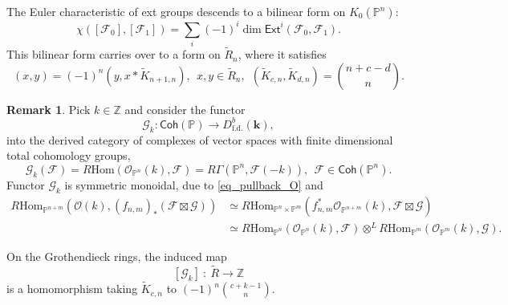 \documentclass{article}
\def\lra{\longrightarrow}
\def\Ext{\mathsf{Ext}}
\def\Z{\mathbb Z}
\newcommand{\Coh}{\mathsf{Coh}}
\newcommand{\kk}{\mathbf{k}}
\newcommand{\mcO}{\mathcal{O}}
\newcommand{\mcF}{\mathcal{F}}
\newcommand{\mcG}{\mathcal{G}}
\newcommand{\wtR}{\widetilde{R}}
\newcommand{\wtK}{\widetilde{K}}
\newcommand{\PP}{\mathbb{P}}
\theoremstyle{definition}
\newtheorem{remark}[thm]{Remark}
\theoremstyle{definition}
\begin{document}
The Euler characteristic of ext groups descends to a bilinear form on $K_0(\PP^n)$:
\[
\chi([\mcF_0],[\mcF_1]) = \sum_i (-1)^i \dim \Ext^i(\mcF_0,\mcF_1).
\]
This bilinear form carries over to a form on $\wtR_n$, where it satisfies
\begin{equation*}
(x,y) = (-1)^n(y,x\ast \wtK_{n+1,n}), \ \ x,y\in \wtR_n, \ \  (\wtK_{c,n}, \wtK_{d,n}) = \binom{n +c-d}{n}.
\end{equation*}

\begin{remark}
    Pick $k\in \Z$ and consider the functor
    \[
    \mcG_k:\Coh(\PP)\lra D^b_{\mathrm{f.d.}}(\kk),
    \]
    into the derived category of complexes of vector spaces with finite dimensional total cohomology groups,
    \[
    \mcG_k(\mcF)=R\mathrm{Hom}(\mcO_{\PP^n}(k),\mcF)=R\Gamma(\PP^n,\mcF(-k)), \ \ \mcF\in\Coh(\PP^n).
    \]
    Functor $\mcG_k$ is symmetric monoidal, due to \eqref{eq_pullback_O} and
    \[
    \begin{aligned}
R\mathrm{Hom}_{\PP^{n+m}}\left(\mathcal{O}(k), (f_{n,m})_*(\mcF \boxtimes \mcG)\right)
&\simeq R\mathrm{Hom}_{\PP^n \times \PP^m}\left(f_{n,m}^* \mcO_{\PP^{n+m}}(k), \mcF \boxtimes \mcG\right) \\
&\simeq R\mathrm{Hom}_{\PP^n}(\mathcal{O}_{\PP^n}(k), \mcF) \otimes^L R\mathrm{Hom}_{\PP^m}(\mcO_{\PP^m}(k), \mcG).
\end{aligned}
    \]
\end{remark}
On the Grothendieck rings, the induced map
\[
[\mcG_k] \ : \ \wtR \lra \Z
\]
is a homomorphism taking $\wtK_{c,n}$ to $(-1)^n \binom{c+k-1}{n}$.
\end{document}
